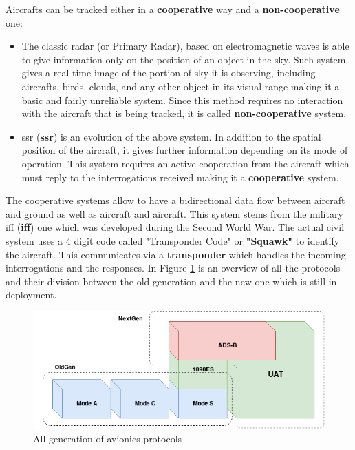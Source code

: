 \documentclass[../main.tex]{subfiles}
\begin{document}
Aircrafts can be tracked either in a \textbf{cooperative} way  and a \textbf{non-cooperative} one:

\begin{itemize}

  \item The classic radar (or Primary Radar), based on electromagnetic waves is able to give information only on the position of an object in the sky. Such system gives a real-time image of the portion of sky it is observing, including aircrafts, birds, clouds, and any other object in its visual range making it a basic and fairly unreliable system. Since this method requires no interaction with the aircraft that is being tracked, it is called \textbf{non-cooperative} system.

  \item \acrlong{ssr} (\textbf{\acrshort{ssr}}) is an evolution of the above system. In addition to the spatial position of the aircraft, it gives further information depending on its mode of operation. This system requires an active cooperation from the aircraft which must reply to the interrogations received making it a \textbf{cooperative} system.

\end{itemize}

The cooperative systems allow to have a bidirectional data flow between aircraft
and ground as well as aircraft and aircraft. This system stems from the military
\acrlong{iff} (\textbf{\acrshort{iff}}) one which was developed during the
Second World War. The actual civil system uses a 4 digit code called
"Transponder Code" or \textbf{"Squawk"} to identify the aircraft. This
communicates via a \textbf{transponder} which handles the incoming
interrogations and the responses. In Figure \ref{fig:allgen} is an overview of
all the protocols and their division between the old generation and the new one
which is still in deployment.

\begin{figure}[htp]
  \centering
  \includegraphics[scale=0.6]{images/allgen.png}
  \caption{All generation of avionics protocols}
  \label{fig:allgen}
\end{figure}
\end{document}
